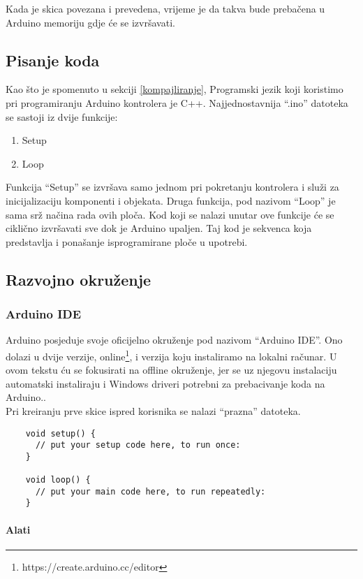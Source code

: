 \documentclass[../Document.tex]{subfiles}
\begin{document}
Kada je skica povezana i prevedena, vrijeme je da takva bude prebačena u Arduino memoriju gdje će se izvršavati.

\subsection{Pisanje koda}
Kao što je spomenuto u sekciji \ref{kompajliranje}, Programski jezik koji koristimo pri programiranju Arduino kontrolera je C++. Najjednostavnija ``.ino'' datoteka se sastoji iz dvije funkcije:

\begin{enumerate}
  \item Setup
  \item Loop
\end{enumerate}

Funkcija ``Setup'' se izvršava samo jednom pri pokretanju kontrolera i služi za inicijalizaciju komponenti i objekata. Druga funkcija, pod nazivom ``Loop'' je sama srž načina rada ovih ploča. Kod koji se nalazi unutar ove funkcije će se ciklično izvršavati sve dok je Arduino upaljen. Taj kod je sekvenca koja predstavlja i ponašanje isprogramirane ploče u upotrebi.

\subsection{Razvojno okruženje}
\subsubsection{Arduino IDE}
Arduino posjeduje svoje oficijelno okruženje pod nazivom ``Arduino IDE''. Ono dolazi u dvije verzije, online\footnote{https://create.arduino.cc/editor}, i verzija koju instaliramo na lokalni računar. U ovom tekstu ću se fokusirati na offline okruženje, jer se uz njegovu instalaciju automatski instaliraju i Windows driveri potrebni za prebacivanje koda na Arduino..\\

\noindent Pri kreiranju prve skice ispred korisnika se nalazi ``prazna'' datoteka.

\begin{verbatim}
    void setup() {
      // put your setup code here, to run once:
    }

    void loop() {
      // put your main code here, to run repeatedly:
    }
\end{verbatim}

\paragraph{Alati}
\end{document}
